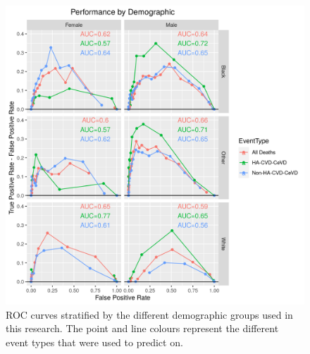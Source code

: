 \documentclass[
]{article}
\begin{document}
\begin{figure}
\hypertarget{fig:ROC_Demog}{%
\centering
\includegraphics{./Rmarkdown_Plots/ROC_CAx-EventType_Demog_10Yr_45-64.png}
\caption{ROC curves stratified by the different demographic groups used in this research. The point and line colours represent the different event types that were used to predict on.}\label{fig:ROC_Demog}
}
\end{figure}
\end{document}
